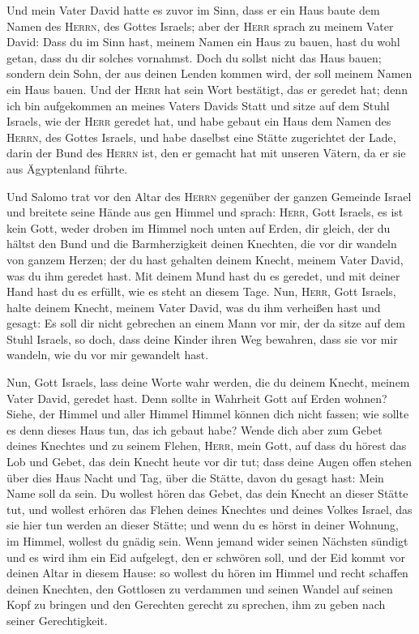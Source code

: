  Und mein Vater David hatte es zuvor im Sinn, dass er ein
Haus baute dem Namen des \textsc{Herrn}, des Gottes Israels;
 aber der \textsc{Herr} sprach zu meinem Vater David:
Dass du im Sinn hast, meinem Namen ein Haus zu bauen, hast du wohl
getan, dass du dir solches vornahmst.  Doch du sollst
nicht das Haus bauen; sondern dein Sohn, der aus deinen Lenden kommen
wird, der soll meinem Namen ein Haus bauen.  Und der
\textsc{Herr} hat sein Wort bestätigt, das er geredet hat; denn ich bin
aufgekommen an meines Vaters Davids Statt und sitze auf dem Stuhl
Israels, wie der \textsc{Herr} geredet hat, und habe gebaut ein Haus dem
Namen des \textsc{Herrn}, des Gottes Israels,  und habe
daselbst eine Stätte zugerichtet der Lade, darin der Bund des
\textsc{Herrn} ist, den er gemacht hat mit unseren Vätern, da er sie aus
Ägyptenland führte.

 Und Salomo trat vor den Altar des \textsc{Herrn}
gegenüber der ganzen Gemeinde Israel und breitete seine Hände aus gen
Himmel  und sprach: \textsc{Herr}, Gott Israels, es ist
kein Gott, weder droben im Himmel noch unten auf Erden, dir gleich, der
du hältst den Bund und die Barmherzigkeit deinen Knechten, die vor dir
wandeln von ganzem Herzen;  der du hast gehalten deinem
Knecht, meinem Vater David, was du ihm geredet hast. Mit deinem Mund
hast du es geredet, und mit deiner Hand hast du es erfüllt, wie es steht
an diesem Tage.  Nun, \textsc{Herr}, Gott Israels, halte
deinem Knecht, meinem Vater David, was du ihm verheißen hast und gesagt:
Es soll dir nicht gebrechen an einem Mann vor mir, der da sitze auf dem
Stuhl Israels, so doch, dass deine Kinder ihren Weg bewahren, dass sie
vor mir wandeln, wie du vor mir gewandelt hast.

 Nun, Gott Israels, lass deine Worte wahr werden, die du
deinem Knecht, meinem Vater David, geredet hast.  Denn
sollte in Wahrheit Gott auf Erden wohnen? Siehe, der Himmel und aller
Himmel Himmel können dich nicht fassen; wie sollte es denn dieses Haus
tun, das ich gebaut habe?  Wende dich aber zum Gebet
deines Knechtes und zu seinem Flehen, \textsc{Herr}, mein Gott, auf dass
du hörest das Lob und Gebet, das dein Knecht heute vor dir tut;
 dass deine Augen offen stehen über dies Haus Nacht und
Tag, über die Stätte, davon du gesagt hast: Mein Name soll da sein. Du
wollest hören das Gebet, das dein Knecht an dieser Stätte tut,
 und wollest erhören das Flehen deines Knechtes und
deines Volkes Israel, das sie hier tun werden an dieser Stätte; und wenn
du es hörst in deiner Wohnung, im Himmel, wollest du gnädig sein.
 Wenn jemand wider seinen Nächsten sündigt und es wird
ihm ein Eid aufgelegt, den er schwören soll, und der Eid kommt vor
deinen Altar in diesem Hause:  so wollest du hören im
Himmel und recht schaffen deinen Knechten, den Gottlosen zu verdammen
und seinen Wandel auf seinen Kopf zu bringen und den Gerechten gerecht
zu sprechen, ihm zu geben nach seiner Gerechtigkeit.

